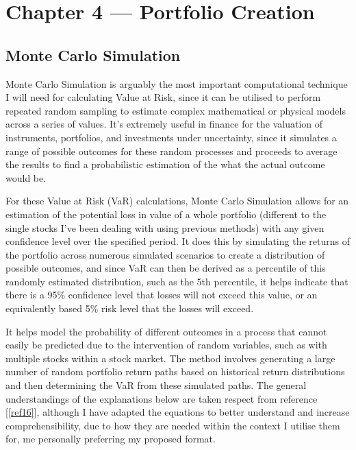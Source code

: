 \documentclass{article}
\begin{document}
\newpage
\section{Chapter 4 --- Portfolio Creation}

\subsection{Monte Carlo Simulation}

Monte Carlo Simulation is arguably the most important computational technique I will need for calculating Value at Risk, since it can be utilised to perform repeated random sampling to estimate complex mathematical or physical models across a series of values. It's extremely useful in finance for the valuation of instruments, portfolios, and investments under uncertainty, since it simulates a range of possible outcomes for these random processes and proceeds to average the results to find a probabilistic estimation of the what the actual outcome would be.\\\vspace{0.3cm}

For these Value at Risk (VaR) calculations, Monte Carlo Simulation allows for an estimation of the potential loss in value of a whole portfolio (different to the single stocks I've been dealing with using previous methods) with any given confidence level over the specified period. It does this by simulating the returns of the portfolio across numerous simulated scenarios to create a distribution of possible outcomes, and since VaR can then be derived as a percentile of this randomly estimated distribution, such as the 5th percentile, it helps indicate that there is a 95\% confidence level that losses will not exceed this value, or an equivalently based 5\% risk level that the losses will exceed.\\\vspace{0.3cm}

It helps model the probability of different outcomes in a process that cannot easily be predicted due to the intervention of random variables, such as with multiple stocks within a stock market. The method involves generating a large number of random portfolio return paths based on historical return distributions and then determining the VaR from these simulated paths. The general understandings of the explanations below are taken respect from reference [\ref{ref16}], although I have adapted the equations to better understand and increase comprehensibility, due to how they are needed within the context I utilise them for, me personally preferring my proposed format.\\\vspace{0.3cm}
\end{document}
